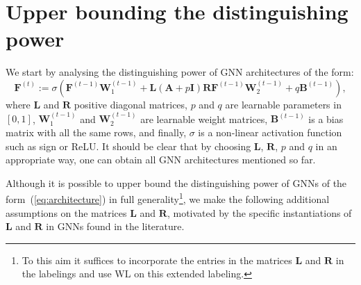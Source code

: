 \section{Upper bounding the distinguishing power}


We start by analysing the distinguishing power of GNN architectures of the form:
\begin{equation}
\mathbf{F}^{(t)}:=\sigma\left(\mathbf{F}^{(t-1)}\mathbf{W}_1^{(t-1)}+\mathbf{L}(\mathbf{A}+p\mathbf{I})\mathbf{R}\mathbf{F}^{(t-1)}\mathbf{W}_2^{(t-1)} + q\mathbf{B}^{(t-1)}\right), \label{eq:architecture}
\end{equation}
where $\mathbf{L}$ and $\mathbf{R}$ positive diagonal matrices, $p$ and $q$ are learnable parameters in $[0,1]$,  $\mathbf{W}_1^{(t-1)}$ and $\mathbf{W}_2^{(t-1)}$  are learnable weight matrices, $\mathbf{B}^{(t-1)}$ is a bias matrix with all the same rows, and finally, $\sigma$ is a non-linear activation function such as sign or ReLU. It should be clear that by choosing 
$\mathbf{L}$, $\mathbf{R}$, $p$ and $q$  in an appropriate way, one can obtain all GNN architectures mentioned so far.

Although it is possible to upper bound the distinguishing power of GNNs of the form~(\ref{eq:architecture}) in full generality\footnote{To this aim it suffices to incorporate the entries in the matrices $\mathbf{L}$ and $\mathbf{R}$ in the labelings and use WL on this extended labeling.}, we make the following additional assumptions on the matrices $\mathbf{L}$ and $\mathbf{R}$, motivated by the specific instantiations of $\mathbf{L}$ and $\mathbf{R}$ in GNNs found in the literature.

